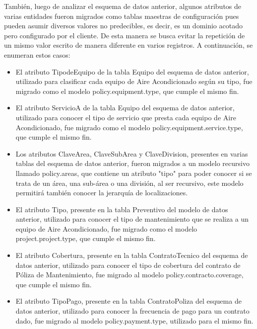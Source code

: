 \documentclass[a4paper, 12pt]{article}
\begin{document}
También, luego de analizar el esquema de datos anterior, algunos atributos de varias entidades fueron migrados como tablas maestras de configuración pues pueden asumir diversos valores no predecibles, es decir, es un dominio acotado pero configurado por el cliente. De esta manera se busca evitar la repetición de un mismo valor escrito de manera diferente en varios registros. A continuación, se enumeran estos casos:

\begin{itemize}
    \item El atributo TipodeEquipo de la tabla Equipo del esquema de datos anterior, utilizado para clasificar cada equipo de Aire Acondicionado según su tipo, fue migrado como el modelo policy.equipment.type, que cumple el mismo fin.
    \item El atributo ServicioA de la tabla Equipo del esquema de datos anterior, utilizado para conocer el tipo de servicio que presta cada equipo de Aire Acondicionado, fue migrado como el modelo policy.equipment.service.type, que cumple el mismo fin.
    \item Los atributos ClaveArea, ClaveSubArea y ClaveDivision, presentes en varias tablas del esquema de datos anterior, fueron migrados a un modelo recursivo llamado policy.areas, que contiene un atributo "tipo" para poder conocer si se trata de un área, una sub-área o una división, al ser recursivo, este modelo permitirá también conocer la jerarquía de localizaciones.
    \item El atributo Tipo, presente en la tabla Preventivo del modelo de datos anterior, utilizado para conocer el tipo de mantenimiento que se realiza a un equipo de Aire Acondicionado, fue migrado como el modelo project.project.type, que cumple el mismo fin.
    \item El atributo Cobertura, presente en la tabla ContratoTecnico del esquema de datos anterior, utilizado para conocer el tipo de cobertura del contrato de Póliza de Mantenimiento, fue migrado al modelo policy.contracto.coverage, que cumple el mismo fin.
    \item El atributo TipoPago, presente en la tabla ContratoPoliza del esquema de datos anterior, utilizado para conocer la frecuencia de pago para un contrato dado, fue migrado al modelo policy.payment.type, utilizado para el mismo fin.
\end{itemize}
\end{document}
